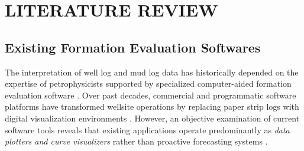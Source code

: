 \chapter{LITERATURE REVIEW}

\section{Existing Formation Evaluation Softwares}

The interpretation of well log and mud log data has historically depended on the expertise of petrophysicists supported by specialized computer-aided formation evaluation software \citep{ref8, wood2020}. Over past decades, commercial and programmatic software platforms have transformed wellsite operations by replacing paper strip logs with digital visualization environments \citep{wood2020}. However, an objective examination of current software tools reveals that existing applications operate predominantly as \textit{data plotters and curve visualizers} rather than proactive forecasting systems \citep{ref8, wood2020}.

